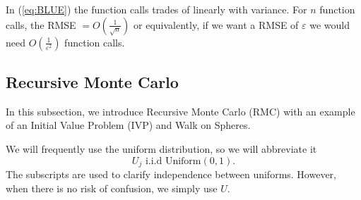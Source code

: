 \documentclass[a4paper,12pt]{article}
\begin{document}
\begin{example}
  In (\ref{eq:BLUE}) the function calls trades of
  linearly with variance. For $n$ function calls,
  the RMSE $= O\left(\frac{1}{\sqrt{n}}\right)$ or equivalently, if we want a
  RMSE of $\varepsilon$ we would need $O\left(\frac{1}{\varepsilon^{2}}\right)$
  function calls.
\end{example}


\subsection{Recursive Monte Carlo}
In this subsection, we introduce Recursive Monte Carlo (RMC)
with an example of an Initial Value Problem (IVP) and
Walk on Spheres.

\begin{notation}[$U,U_{j}$]
  We will frequently use the uniform distribution, so we will abbreviate it
  \begin{equation}
    U_{j}  \text{ i.i.d Uniform}(0,1).
  \end{equation}
  The subscripts are used to clarify independence
  between uniforms. However,
  when there is no risk of confusion,
  we simply use $U.$
\end{notation}
\end{document}
